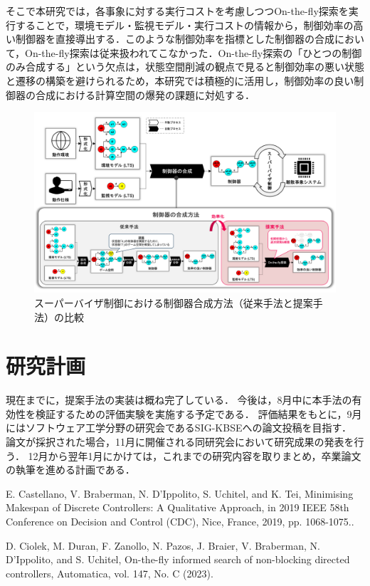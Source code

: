 \documentclass[11pt]{jarticle}
\begin{document}
そこで本研究では，各事象に対する実行コストを考慮しつつOn-the-fly探索を実行することで，環境モデル・監視モデル・実行コストの情報から，制御効率の高い制御器を直接導出する．このような制御効率を指標とした制御器の合成において，On-the-fly探索は従来扱われてこなかった．On-the-fly探索の「ひとつの制御のみ合成する」という欠点は，状態空間削減の観点で見ると制御効率の悪い状態と遷移の構築を避けられるため，本研究では積極的に活用し，制御効率の良い制御器の合成における計算空間の爆発の課題に対処する．

\begin{figure}[h]
  \centering
  \includegraphics[width=16cm]{./figures/proposal.png}
  \caption{スーパーバイザ制御における制御器合成方法（従来手法と提案手法）の比較}
  \label{fig:proposal}
\end{figure}


\section{研究計画}
現在までに，提案手法の実装は概ね完了している．
今後は，8月中に本手法の有効性を検証するための評価実験を実施する予定である．
評価結果をもとに，9月にはソフトウェア工学分野の研究会であるSIG-KBSEへの論文投稿を目指す．
論文が採択された場合，11月に開催される同研究会において研究成果の発表を行う．
12月から翌年1月にかけては，これまでの研究内容を取りまとめ，卒業論文の執筆を進める計画である．


\begin{thebibliography}{99} %
{\footnotesize

E. Castellano, V. Braberman, N. D'Ippolito, S. Uchitel, and K. Tei, 
Minimising Makespan of Discrete Controllers: A Qualitative Approach,
in 2019 IEEE 58th
Conference on Decision and Control (CDC), Nice, France, 2019, pp. 1068-1075..

D. Ciolek, M. Duran, F. Zanollo, N. Pazos, J. Braier, V. Braberman, N. D'Ippolito, and S.
Uchitel, On-the-fly informed search of non-blocking directed controllers,
Automatica, vol. 147, No. C (2023).

}
\end{thebibliography} %

\end{document}
